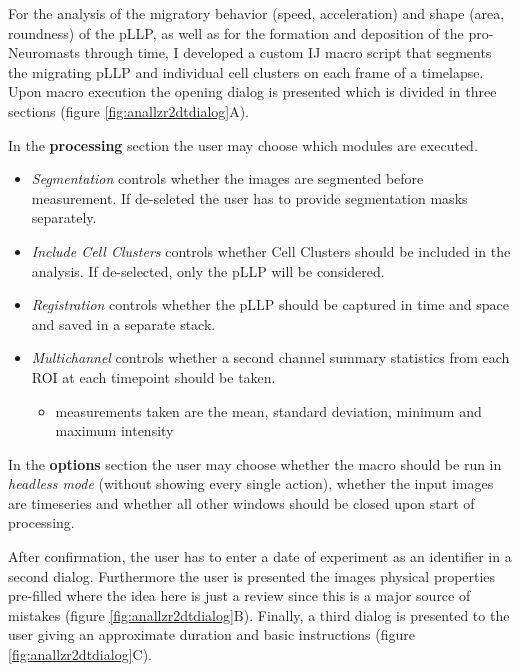 \documentclass[10pt, b5paper, singlespacinge, twoside]{reedthesis} %
\providecommand{\tightlist}{%
  \setlength{\itemsep}{0pt}\setlength{\parskip}{0pt}}
\theoremstyle{definition}
\theoremstyle{definition}
\theoremstyle{definition}
\theoremstyle{remark}
\begin{document}
For the analysis of the migratory behavior (speed, acceleration) and shape (area, roundness) of the pLLP, as well as for the formation and deposition of the pro-Neuromasts through time, I developed a custom IJ macro script that segments the migrating pLLP and individual cell clusters on each frame of a timelapse. Upon macro execution the opening dialog is presented which is divided in three sections (figure \ref{fig:anallzr2dtdialog}A).

In the \textbf{processing} section the user may choose which modules are executed.
\begin{itemize}
\tightlist
\item
  \emph{Segmentation} controls whether the images are segmented before measurement. If de-seleted the user has to provide segmentation masks separately.
\item
  \emph{Include Cell Clusters} controls whether Cell Clusters should be included in the analysis. If de-selected, only the pLLP will be considered.
\item
  \emph{Registration} controls whether the pLLP should be captured in time and space and saved in a separate stack.
\item
  \emph{Multichannel} controls whether a second channel summary statistics from each ROI at each timepoint should be taken.
  \begin{itemize}
  \tightlist
  \item
    measurements taken are the mean, standard deviation, minimum and maximum intensity
  \end{itemize}
\end{itemize}
In the \textbf{options} section the user may choose whether the macro should be run in \emph{headless mode} (without showing every single action), whether the input images are timeseries and whether all other windows should be closed upon start of processing.

After confirmation, the user has to enter a date of experiment as an identifier in a second dialog. Furthermore the user is presented the images physical properties pre-filled where the idea here is just a review since this is a major source of mistakes (figure \ref{fig:anallzr2dtdialog}B). Finally, a third dialog is presented to the user giving an approximate duration and basic instructions (figure \ref{fig:anallzr2dtdialog}C).
\end{document}
